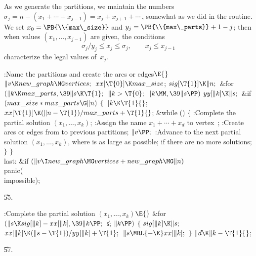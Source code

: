 As we generate the partitions, we maintain
the numbers $\sigma_j=n-(x_1+\cdots+x_{j-1})=x_j+x_{j+1}+\cdots\,$,
somewhat as we did in the  routine. We set $x_0=\PB{\\{max%
\_size}}$
and $y_j=\PB{\\{max\_parts}}+1-j$; then when values $(x_1,\ldots,x_{j-1})$ are
given, the conditions
$$\sigma_j/y_j\le x_j\le \sigma_j,\qquad x_j\le x_{j-1}$$
characterize the legal values of~$x_j$.

\Y\B\4:Name the partitions and create the arcs or edges\X${}\E{}$\6
$\|v\K\\{new\_graph}\MG\\{vertices};{}$\6
${}\\{xx}[\T{0}]\K\\{max\_size}{}$;\5
${}\\{sig}[\T{1}]\K\|n;{}$\6
\&{for} ${}(\|k\K\\{max\_parts},\39\|s\K\T{1};{}$ ${}\|k>\T{0};{}$ ${}\|k\MM,%
\39\|s\PP){}$\1\5
${}\\{yy}[\|k]\K\|s;{}$\2\6
\&{if} ${}(\\{max\_size}*\\{max\_parts}\G\|n){}$\5
${}\{{}$\1\6
${}\|k\K\T{1}{}$;\5
${}\\{xx}[\T{1}]\K(\|n-\T{1})/\\{max\_parts}+\T{1}{}$;\6
\&{while} ()\5
${}\{{}$\1\6
:Complete the partial solution $(x_1,\ldots,x_k)$\X;\6
:Assign the name $x_1+\cdots+x_d$ to vertex~\X;\6
:Create arcs or edges from  to previous partitions\X;\6
${}\|v\PP;{}$\6
:Advance to the next partial solution $(x_1,\ldots,x_k)$, where  is
as large as possible;  if there are no more solutions\X;\6
\4${}\}{}$\2\6
\4${}\}{}$\2\6
\4\\{last}:\5
\&{if} ${}(\|v\I\\{new\_graph}\MG\\{vertices}+\\{new\_graph}\MG\|n){}$\1\5
\\{panic}(\\{impossible});\2\par
\U55.\fi

\B{}:Complete the partial solution $(x_1,\ldots,x_k)$\X${}\E{}$\6
\&{for} ${}(\|s\K\\{sig}[\|k]-\\{xx}[\|k],\39\|k\PP;{}$ \|s; ${}\|k\PP){}$\5
${}\{{}$\1\6
${}\\{sig}[\|k]\K\|s;{}$\6
${}\\{xx}[\|k]\K(\|s-\T{1})/\\{yy}[\|k]+\T{1};{}$\6
${}\|s\MRL{-{\K}}\\{xx}[\|k];{}$\6
\4${}\}{}$\2\6
${}\|d\K\|k-\T{1}{}$;\par
\U57.\fi

